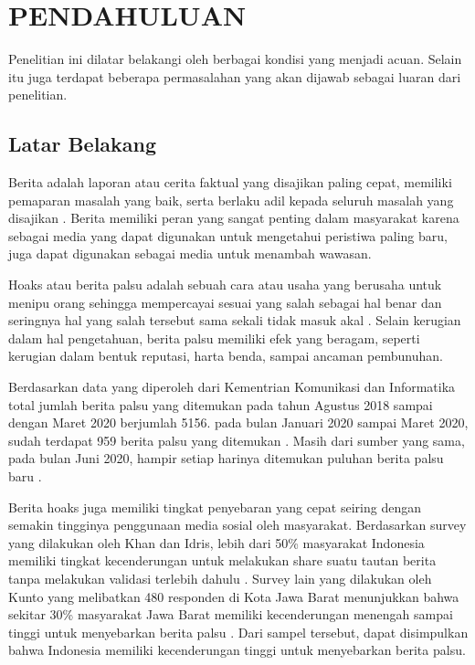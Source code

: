 \chapter{PENDAHULUAN}
\label{chap:pendahuluan}


Penelitian ini dilatar belakangi oleh berbagai kondisi yang menjadi acuan. Selain itu juga terdapat beberapa permasalahan yang akan dijawab sebagai luaran dari penelitian.

\section{Latar Belakang}
\label{sec:latarbelakang}

Berita adalah laporan atau cerita faktual yang disajikan paling cepat, memiliki pemaparan masalah yang baik, serta berlaku adil kepada seluruh masalah yang disajikan \cite{rani2013persepsi}. Berita memiliki peran yang sangat penting dalam masyarakat karena sebagai media yang dapat digunakan untuk mengetahui peristiwa paling baru, juga dapat digunakan sebagai media untuk menambah wawasan.

Hoaks atau berita palsu adalah sebuah cara atau usaha yang berusaha untuk menipu orang sehingga mempercayai sesuai yang salah sebagai hal benar dan seringnya hal yang salah tersebut sama sekali tidak masuk akal \cite{berita_bohong}. Selain kerugian dalam hal pengetahuan, berita palsu memiliki efek yang beragam, seperti kerugian dalam bentuk reputasi, harta benda, sampai ancaman pembunuhan.

Berdasarkan data yang diperoleh dari Kementrian Komunikasi dan Informatika total jumlah berita palsu yang ditemukan pada tahun Agustus 2018 sampai dengan Maret 2020 berjumlah 5156. pada bulan Januari 2020 sampai Maret 2020, sudah terdapat 959 berita palsu yang ditemukan \cite{kominfoStatHoax}. Masih dari sumber yang sama, pada bulan Juni 2020, hampir setiap harinya ditemukan puluhan berita palsu baru \cite{kominfoJuni2020}.

Berita hoaks juga memiliki tingkat penyebaran yang cepat seiring dengan semakin tingginya penggunaan media sosial oleh masyarakat. Berdasarkan survey yang dilakukan oleh Khan dan Idris, lebih dari 50\% masyarakat Indonesia memiliki tingkat kecenderungan untuk melakukan share suatu tautan berita tanpa melakukan validasi terlebih dahulu \cite{khan}. Survey lain yang dilakukan oleh Kunto yang melibatkan 480 responden di Kota Jawa Barat menunjukkan bahwa sekitar 30\% masyarakat Jawa Barat memiliki kecenderungan menengah sampai tinggi untuk menyebarkan berita palsu \cite{kuntoUmur}. Dari sampel tersebut, dapat disimpulkan bahwa Indonesia memiliki kecenderungan tinggi untuk menyebarkan berita palsu.

